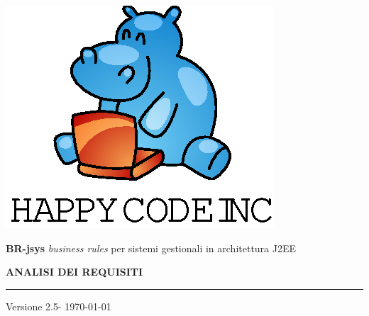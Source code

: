 \documentclass[11pt,titlepage,a4paper]{report}
\begin{document}
\newcommand{\lv}{2.5} %



\begin{titlepage}
\begin{center}
\vspace*{0.5in}
\includegraphics{logo.eps}
\vspace*{0.2in}

{\Large \textbf{BR-jsys}}
{\Large \emph{business rules} per sistemi gestionali in architettura J2EE } 
\vspace{2in}

\LARGE \textbf {ANALISI DEI REQUISITI}
\par\rule{10cm}{0.4pt} \par {\large Versione \lv - \today}


\end{center}
\end{titlepage}
\vspace*{0.5in}
\end{document}
